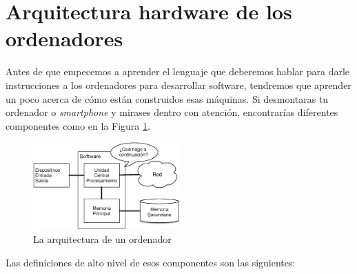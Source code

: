\hypertarget{arquitectura-hardware-de-los-ordenadores}{%
\section{Arquitectura hardware de los
ordenadores}\label{arquitectura-hardware-de-los-ordenadores}}

 

Antes de que empecemos a aprender el lenguaje que deberemos hablar para
darle instrucciones a los ordenadores para desarrollar software,
tendremos que aprender un poco acerca de cómo están construidos esas
máquinas. Si desmontaras tu ordenador o \emph{smartphone} y mirases
dentro con atención, encontrarías diferentes componentes
como en la Figura \ref{fig:arch}.

\begin{figure}
    \centering
    \includegraphics[width=0.5\textwidth]{images/arch.eps}
    \caption{La arquitectura de un ordenador}
    \label{fig:arch}
\end{figure}


Las definiciones de alto nivel de esos componentes son las siguientes:

